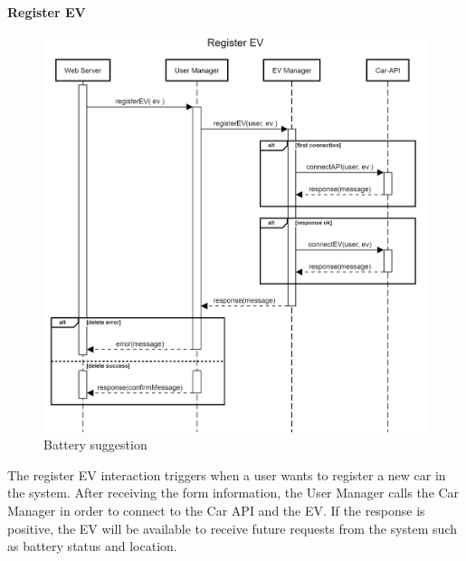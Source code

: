 \documentclass[table, 12pt]{article}
\begin{document}
\textbf{Register EV}
\begin{center}
    \begin{figure}[H]
        \includegraphics[scale=0.20, center]{assets/sequenceDiagrams/User register ev.png}
        \caption{Battery suggestion}
        \label{Battery suggestion}
    \end{figure}
\end{center}
\newpage
The register EV interaction triggers when a user wants to register a new car in the system.
After receiving the form information, the User Manager calls the Car Manager in order to connect to the Car API and the EV.
If the response is positive, the EV will be available to receive future requests from the system such as battery status and location.
\newpage
\end{document}
